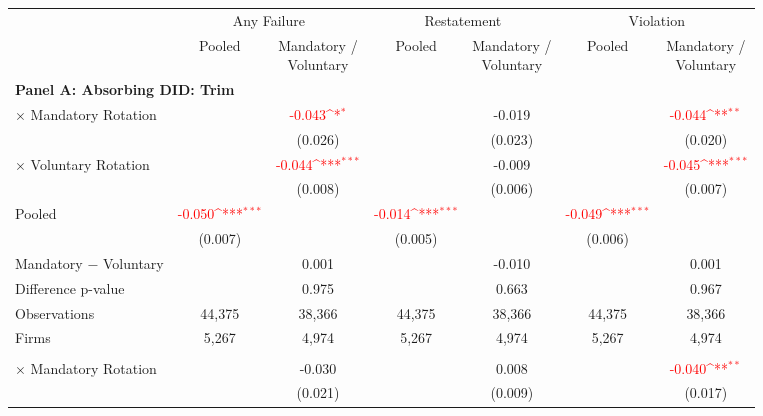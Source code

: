 \documentclass[10pt]{article}
\newcommand{\sym}[1]{\textsuperscript{#1}}
\begin{document}
\begin{minipage}{19cm}\fontsize{10}{12}\selectfont\setlength{\tabcolsep}{4pt}\renewcommand{\arraystretch}{1.12}


\def\sym#1{\ifmmode^{#1}\else\(^{#1}\)\fi}
\centering
{}
\label{tab:absorbing-transition-akm-violation-good-downgrade-no-auditfirm-fe}
\begin{threeparttable}

\begin{tabular}{l cc cc cc}
\toprule
 & \multicolumn{2}{c}{Any Failure} & \multicolumn{2}{c}{Restatement} & \multicolumn{2}{c}{Violation} \\
\cmidrule(lr){2-3}\cmidrule(lr){4-5}\cmidrule(lr){6-7}
 & Pooled & \shortstack{Mandatory /\\Voluntary} & Pooled & \shortstack{Mandatory /\\Voluntary} & Pooled & \shortstack{Mandatory /\\Voluntary} \\
\midrule
\multicolumn{7}{l}{\textbf{Panel A: Absorbing DID: Trim}} \\
$\times$ Mandatory Rotation &  & \textcolor{red}{-0.043\sym{*}} &  & -0.019 &  & \textcolor{red}{-0.044\sym{**}} \\
 &  & (0.026) &  & (0.023) &  & (0.020) \\
$\times$ Voluntary Rotation &  & \textcolor{red}{-0.044\sym{***}} &  & -0.009 &  & \textcolor{red}{-0.045\sym{***}} \\
 &  & (0.008) &  & (0.006) &  & (0.007) \\
Pooled & \textcolor{red}{-0.050\sym{***}} &  & \textcolor{red}{-0.014\sym{***}} &  & \textcolor{red}{-0.049\sym{***}} &  \\
 & (0.007) &  & (0.005) &  & (0.006) &  \\
Mandatory $-$ Voluntary &  & 0.001 &  & -0.010 &  & 0.001 \\
Difference p-value &  & 0.975 &  & 0.663 &  & 0.967 \\
Observations & 44,375 & 38,366 & 44,375 & 38,366 & 44,375 & 38,366 \\
Firms & 5,267 & 4,974 & 5,267 & 4,974 & 5,267 & 4,974 \\
\addlinespace
\multicolumn{7}{l}{\textbf{Panel B: Absorbing DID: Strict}} \\
$\times$ Mandatory Rotation &  & -0.030 &  & 0.008 &  & \textcolor{red}{-0.040\sym{**}} \\
 &  & (0.021) &  & (0.009) &  & (0.017) \\

\end{tabular}
\end{threeparttable}
\end{minipage}
\end{document}

